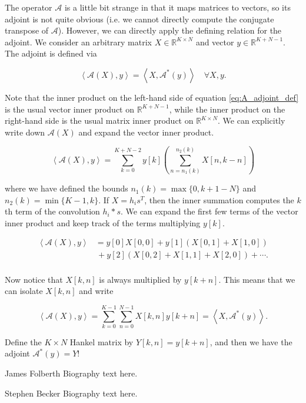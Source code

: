 \documentclass[journal]{IEEEtran}
\newcommand{\reals}{\mathbb{R}}
\begin{document}
The operator $\mathcal{A}$ is a little bit strange in that it maps matrices to vectors, so its adjoint is not quite obvious (i.e. we cannot directly compute the conjugate transpose of $\mathcal{A}$).  However, we can directly apply the defining relation for the adjoint.  We consider an arbitrary matrix $X\in\reals^{K\times N}$ and vector $y\in\reals^{K+N-1}$.  The adjoint is defined via

\begin{equation}
   \label{eq:A_adjoint_def}
   \left\langle \mathcal{A}(X),y \right\rangle = \left\langle X, \mathcal{A}^\ast(y)\right\rangle \quad \forall X,y.
\end{equation}

\noindent Note that the inner product on the left-hand side of equation \ref{eq:A_adjoint_def} is the usual vector inner product on $\reals^{K+N-1}$, while the inner product on the right-hand side is the usual matrix inner product on $\reals^{K\times N}$.  We can explicitly write down $\mathcal{A}(X)$ and expand the vector inner product.

\[ \left\langle \mathcal{A}(X),y\right\rangle = \sum_{k=0}^{K+N-2}y[k] \left(\sum_{n=n_1(k)}^{n_2(k)} X[n,k-n]\right) \] 

\noindent where we have defined the bounds $n_1(k) = {\max\{0,k+1-N\}}$ and $n_2(k) = {\min\{K-1,k\}}$.  If $X=h_is^T$, then the inner summation computes the $k$th term of the convolution $h_i\ast s$.  We can expand the first few terms of the vector inner product and keep track of the terms multiplying $y[k]$.

\begin{align*}
   \left\langle\mathcal{A}(X),y\right\rangle &= y[0]X[0,0] + y[1]\left(X[0,1]+X[1,0]\right)\\
                                             &\,+ y[2]\left(X[0,2] + X[1,1] + X[2,0]\right) + \cdots.\\
\end{align*}

\noindent Now notice that $X[k,n]$ is always multiplied by $y[k+n]$.  This means that we can isolate $X[k,n]$ and write

\[ \left\langle\mathcal{A}(X),y\right\rangle = \sum_{k=0}^{K-1}\sum_{n=0}^{N-1} X[k,n]y[k+n] = \left\langle X,\mathcal{A}^\ast(y)\right\rangle. \] 

\noindent Define the $K\times N$ Hankel matrix by $Y[k,n] = y[k+n]$, and then we have the adjoint $\mathcal{A}^\ast(y) = Y$!





\begin{IEEEbiographynophoto}{James Folberth}
Biography text here.
\end{IEEEbiographynophoto}

\begin{IEEEbiographynophoto}{Stephen Becker}
Biography text here.
\end{IEEEbiographynophoto}
\end{document}
